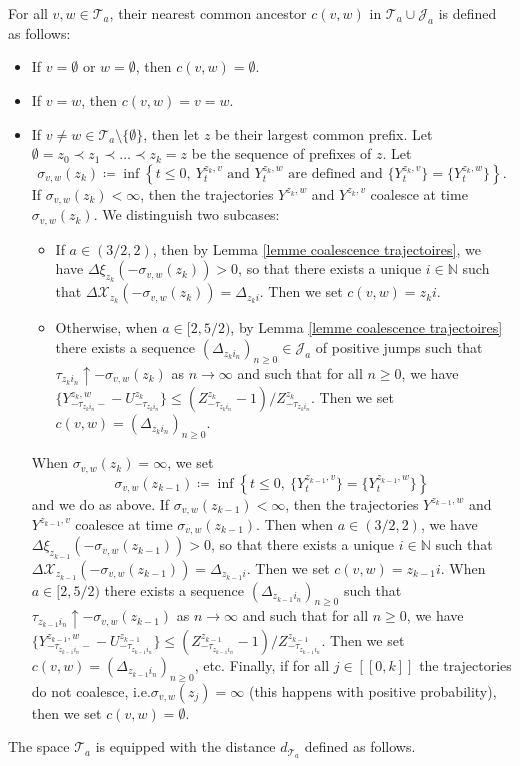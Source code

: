 \documentclass[11pt]{article}
\numberwithin{equation}{section}
\def \N{\mathbb{N}}
\def\lb{[\![}
\def\rb{]\!]}
\begin{document}
For all $v, w\in \mathcal{T}_a$, their nearest common ancestor $c(v,w)$ in $\mathcal{T}_a\cup \mathcal{J}_a$ is defined as follows:
\begin{itemize}
	\item If $v=\emptyset$ or $w=\emptyset$, then $c(v,w)=\emptyset$.
	\item If $v=w$, then $c(v,w)=v=w$.
	\item If $v\neq w \in \mathcal{T}_a\setminus \{\emptyset\}$, then let $z$ be their largest common prefix. Let $\emptyset=z_0\prec z_1\prec \ldots \prec z_k = z$ be the sequence of prefixes of $z$. Let
	$$
	\sigma_{v,w}(z_k)\coloneqq \inf\left\{ t \le 0, \ Y^{z_k,v}_t \text{ and } Y^{z_k,w}_t \text{ are defined and }
	\{Y^{z_k,v}_t\}
	=
	\{Y^{z_k,w}_t\}
	  \right\}.
	$$
	If $\sigma_{v,w}(z_k)<\infty$, then the trajectories $Y^{z_k,w}$ and $Y^{z_k,v}$ coalesce at time $\sigma_{v,w}(z_k)$. We distinguish two subcases:
	\begin{itemize}
		\item If $a\in (3/2,2)$, then by Lemma \ref{lemme coalescence trajectoires}, we have $\Delta \xi_{z_k} (- \sigma_{v,w}(z_k))>0$, so that there exists a unique $i\in \N$ such that $\Delta \mathcal{X}_{z_k}({-\sigma_{v,w}(z_k)}) = \Delta_{z_ki}$. Then we set $c(v,w)= z_k i$. 
		\item Otherwise, when $a \in [2,5/2)$, by Lemma \ref{lemme coalescence trajectoires} there exists a sequence $(\Delta_{z_{k}i_n})_{n\ge 0}\in \mathcal{J}_a$ of positive jumps such that $\tau_{z_ki_n} \uparrow -\sigma_{v,w}(z_k)$ as $n\to \infty$ and such that for all $n \ge 0$, we have $\{Y^{z_k,w}_{-\tau_{z_ki_n}-}-U^{z_k}_{-\tau_{z_ki_n}}\} \le (Z^{z_k}_{-\tau_{z_ki_n}}-1)/Z^{z_k}_{-\tau_{z_ki_n}}$. Then we set $c(v,w) = (\Delta_{z_{k}i_n})_{n\ge 0}$.
	\end{itemize}
	When $\sigma_{v,w}(z_k) = \infty$, we set 
	$$
	\sigma_{v,w}(z_{k-1})\coloneqq \inf\left\{ t \le 0, \
	\{Y^{z_{k-1},v}_t\}
	=
	\{Y^{z_{k-1},w}_t\}
	  \right\}
	$$
	and we do as above. If $\sigma_{v,w}(z_{k-1})<\infty$, then the trajectories $Y^{z_{k-1},w}$ and $Y^{z_{k-1},v}$ coalesce at time $\sigma_{v,w}(z_{k-1})$. Then when $a\in (3/2,2)$, we have $\Delta \xi_{z_{k-1}}({-\sigma_{v,w}(z_{k-1})}) > 0$, so that there exists a unique $i\in \N$ such that $\Delta \mathcal{X}_{z_{k-1}}({-\sigma_{v,w}(z_{k-1})}) = \Delta_{z_{k-1}i}$. Then we set $c(v,w)= z_{k-1} i$. When $a \in [2,5/2)$ there exists a sequence $(\Delta_{z_{k-1} i_n})_{n\ge 0}$ such that $\tau_{z_{k-1}i_n} \uparrow -\sigma_{v,w}(z_{k-1})$ as $n \to \infty$ and such that for all $n \ge 0$, we have $\{Y^{z_{k-1},w}_{-\tau_{z_{k-1}i_n}-}-U^{z_{k-1}}_{-\tau_{z_{k-1}i_n}}\} \le (Z^{z_{k-1}}_{-\tau_{z_{k-1}i_n}}-1)/Z^{z_{k-1}}_{-\tau_{z_{k-1}i_n}}$. Then we set $c(v,w) = (\Delta_{z_{k-1}i_n})_{n\ge 0}$, etc.  Finally, if for all $j \in \lb 0,k\rb$ the trajectories do not coalesce, i.e.\@ $\sigma_{v,w}(z_j)=\infty$ (this happens with positive probability), then we set $c(v,w)=\emptyset$.
\end{itemize}
The space $\mathcal{T}_a$ is equipped with the distance $d_{\mathcal{T}_a}$ defined as follows. 
\end{document}
